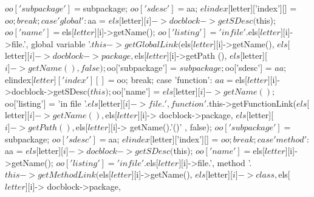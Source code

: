 \begin{DoxyCode}
{{{{{                            $oo['subpackage'] = $subpackage;
                            $oo['sdesc'] = $aa;
                            $elindex[$letter]['index'][] = $oo;
                        break;
                        case 'global':
                            $aa = $els[$letter][$i]->docblock->getSDesc($this);
                            $oo['name'] = $els[$letter][$i]->getName();
                            $oo['listing'] =
                                'in file '.$els[$letter][$i]->file.', global
       variable '.$this->getGlobalLink($els[$letter][$i]->getName(),
                                                     $els[$letter][$i]->
      docblock->package,
                                                     $els[$letter][$i]->getPath
      (),
                                                     $els[$letter][$i]->getName
      ()
                                                     ,false);
                            $oo['subpackage'] = $subpackage;
                            $oo['sdesc'] = $aa;
                            $elindex[$letter]['index'][] = $oo;
                        break;
                        case 'function':
                            $aa = $els[$letter][$i]->docblock->getSDesc($this);
                            $oo['name'] = $els[$letter][$i]->getName();
                            $oo['listing'] =
                                'in file '.$els[$letter][$i]->file.', function 
      '.$this->getFunctionLink($els[$letter][$i]->getName(),
                                                       $els[$letter][$i]->
      docblock->package,
                                                       $els[$letter][$i]->
      getPath(),
                                                       $els[$letter][$i]->
      getName().'()'
                                                       , false);
                            $oo['subpackage'] = $subpackage;
                            $oo['sdesc'] = $aa;
                            $elindex[$letter]['index'][] = $oo;
                        break;
                        case 'method':
                            $aa = $els[$letter][$i]->docblock->getSDesc($this);
                            $oo['name'] = $els[$letter][$i]->getName();
                            $oo['listing'] =
                                'in file '.$els[$letter][$i]->file.', method '.
      $this->getMethodLink($els[$letter][$i]->getName(),
                                                     $els[$letter][$i]->class,
                                                     $els[$letter][$i]->
      docblock->package,
}}}}}
\end{DoxyCode}

